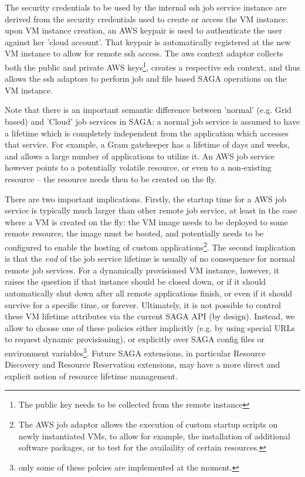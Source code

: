 \documentclass[conference,final]{IEEEtran}
\newcommand{\I}[1]{\textit{#1}}
\begin{document}
The security credentials to be used by the internal ssh job service
instance are derived from the security credentials used to create or
access the VM instance: upon VM instance creation, an AWS keypair is
used to authenticate the user against her 'cloud account'.  That
keypair is automatically registered at the new VM instance to allow
for remote ssh access.  The aws context adaptor collects both the
public and private AWS keys\footnote{The public key needs to be
  collected from the remote instance}, creates a respective ssh
context, and thus allows the ssh adaptors to perform job and file
based SAGA operations on the VM instance.

Note that there is an important semantic difference between 'normal'
(e.g. Grid based) and 'Cloud' job services in SAGA: a normal job
service is assumed to have a lifetime which is completely independent
from the application which accesses that service.  For example, a Gram
gatekeeper has a lifetime of days and weeks, and allows a large number
of applications to utilize it.  An AWS job service however points to a
potentially volatile resource, or even to a non-existing resource --
the resource needs then to be created on the fly.

There are two important implications.  Firstly, the startup time for a
AWS job service is typically much larger than other remote job
service, at least in the case where a VM is created on the fly: the VM
image needs to be deployed to some remote resource, the image must be
booted, and potentially needs to be configured to enable the hosting
of custom applications\footnote{The AWS job adaptor allows the
  execution of custom startup scripts on newly instantiated VMs, to
  allow for example, the installation of additional software packages,
  or to test for the availaility of certain resources.}.
The second implication is that the \I{end} of the job service lifetime
is usually of no consequence for normal remote job services.  For a
dynamically provisioned VM instance, however, it raises the question
if that instance should be closed down, or if it should automatically
shut down after all remote applications finish, or even if it should
survive for a specific time, or forever.  Ultimately, it is not
possible to control these VM lifetime attributes via the current SAGA
API (by design).  Instead, we allow to choose one of these policies
either implicitly (e.g. by using special URLs to request dynamic
provisioning), or explicitly over SAGA config files or environment
variables\footnote{only some of these polcies are implemented at the
  moment.}.  Future SAGA extensions, in particular Resource Discovery
and Resource Reservation extensions, may have a more direct and
explicit notion of resource lifetime management.
\end{document}
